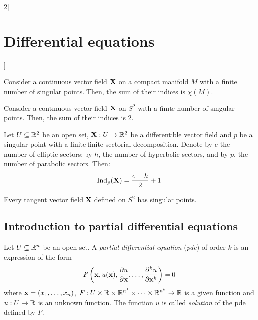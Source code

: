 \documentclass[../../../main.tex]{subfiles}
\begin{document}
\begin{multicols}{2}[\section{Differential equations}]
  \begin{theorem}
    Consider a continuous vector field $\boldsymbol{\mathrm{X}}$ on a compact manifold $M$ with a finite number of singular points. Then, the sum of their indices is $\chi(M)$.
  \end{theorem}
  \begin{corollary}
    Consider a continuous vector field $\boldsymbol{\mathrm{X}}$ on $S^2$ with a finite number of singular points. Then, the sum of their indices is 2.
  \end{corollary}
  \begin{proposition}
    Let $U\subseteq \mathbb{R}^2$ be an open set, $\boldsymbol{\mathrm{X}}:U\rightarrow\mathbb{R}^2$ be a differentible vector field and $p$ be a singular point with a finite finite sectorial decomposition. Denote by $e$ the number of elliptic sectors; by $h$, the number of hyperbolic sectors, and by $p$, the number of parabolic sectors. Then: $$\operatorname{Ind}_{p}(\boldsymbol{\mathrm{X}})=\frac{e-h}{2}+1$$
  \end{proposition}
  \begin{corollary}
    Every tangent vector field $\boldsymbol{\mathrm{X}}$ defined on $S^2$ has singular points.
  \end{corollary}
  \subsection{Introduction to partial differential equations}
  \begin{definition}
    Let $U\subseteq \mathbb{R}^n$ be an open set. A \emph{partial differential equation} (\emph{pde}) of order $k$ is an expression of the form $$F\left(\boldsymbol{\mathrm{x}},u(\boldsymbol{\mathrm{x}}),\pdv{u}{\boldsymbol{\mathrm{x}}},\ldots,\pdv[k]{u}{\boldsymbol{\mathrm{x}}}\right)=0$$ where $\boldsymbol{\mathrm{x}}=(x_1,\ldots,x_n)$, $F:U\times\mathbb{R}\times\mathbb{R}^{n^1}\times\cdots\times\mathbb{R}^{n^k}\rightarrow\mathbb{R}$ is a given function and $u:U\rightarrow \mathbb{R}$ is an unknown function. The function $u$ is called \emph{solution} of the pde defined by $F$.
  \end{definition}

\end{multicols}
\end{document}
